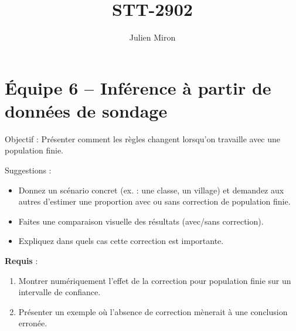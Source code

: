 \documentclass{article}
\title{STT-2902}
\author{Julien Miron}
\begin{document}
\section*{Équipe 6 – Inférence à partir de données de sondage}

Objectif : Présenter comment les règles changent lorsqu’on travaille avec une population finie.


\vspace{1cm}
Suggestions :
\begin{itemize}
    \item Donnez un scénario concret (ex. : une classe, un village) et demandez aux autres d'estimer une proportion avec ou sans correction de population finie.
    \item Faites une comparaison visuelle des résultats (avec/sans correction).
    \item Expliquez dans quels cas cette correction est importante.

\end{itemize}

\vspace{1cm}
\textbf{Requis} :
\begin{enumerate}
    \item Montrer numériquement l’effet de la correction pour population finie sur un intervalle de confiance.
    \item Présenter un exemple où l’absence de correction mènerait à une conclusion erronée.
\end{enumerate}
\end{document}
